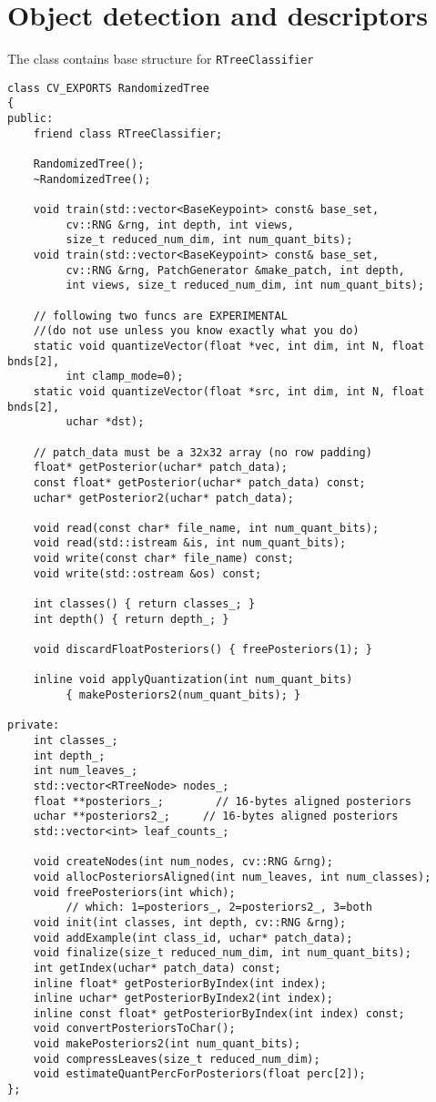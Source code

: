 \section{Object detection and descriptors}
\ifCpp

The class contains base structure for \texttt{RTreeClassifier}

\begin{lstlisting}
class CV_EXPORTS RandomizedTree
{  
public:
	friend class RTreeClassifier;  

	RandomizedTree();
	~RandomizedTree();

	void train(std::vector<BaseKeypoint> const& base_set,
		 cv::RNG &rng, int depth, int views,
		 size_t reduced_num_dim, int num_quant_bits);
	void train(std::vector<BaseKeypoint> const& base_set,
		 cv::RNG &rng, PatchGenerator &make_patch, int depth,
		 int views, size_t reduced_num_dim, int num_quant_bits);

	// following two funcs are EXPERIMENTAL 
	//(do not use unless you know exactly what you do)
	static void quantizeVector(float *vec, int dim, int N, float bnds[2],
		 int clamp_mode=0);
	static void quantizeVector(float *src, int dim, int N, float bnds[2],
		 uchar *dst);  

	// patch_data must be a 32x32 array (no row padding)
	float* getPosterior(uchar* patch_data);
	const float* getPosterior(uchar* patch_data) const;
	uchar* getPosterior2(uchar* patch_data);

	void read(const char* file_name, int num_quant_bits);
	void read(std::istream &is, int num_quant_bits);
	void write(const char* file_name) const;
	void write(std::ostream &os) const;

	int classes() { return classes_; }
	int depth() { return depth_; }

	void discardFloatPosteriors() { freePosteriors(1); }

	inline void applyQuantization(int num_quant_bits)
		 { makePosteriors2(num_quant_bits); }

private:
	int classes_;
	int depth_;
	int num_leaves_;  
	std::vector<RTreeNode> nodes_;  
	float **posteriors_;        // 16-bytes aligned posteriors
	uchar **posteriors2_;     // 16-bytes aligned posteriors
	std::vector<int> leaf_counts_;

	void createNodes(int num_nodes, cv::RNG &rng);
	void allocPosteriorsAligned(int num_leaves, int num_classes);
	void freePosteriors(int which);   
		 // which: 1=posteriors_, 2=posteriors2_, 3=both
	void init(int classes, int depth, cv::RNG &rng);
	void addExample(int class_id, uchar* patch_data);
	void finalize(size_t reduced_num_dim, int num_quant_bits);  
	int getIndex(uchar* patch_data) const;
	inline float* getPosteriorByIndex(int index);
	inline uchar* getPosteriorByIndex2(int index);
	inline const float* getPosteriorByIndex(int index) const;
	void convertPosteriorsToChar();
	void makePosteriors2(int num_quant_bits);
	void compressLeaves(size_t reduced_num_dim);  
	void estimateQuantPercForPosteriors(float perc[2]);
};
\end{lstlisting}

